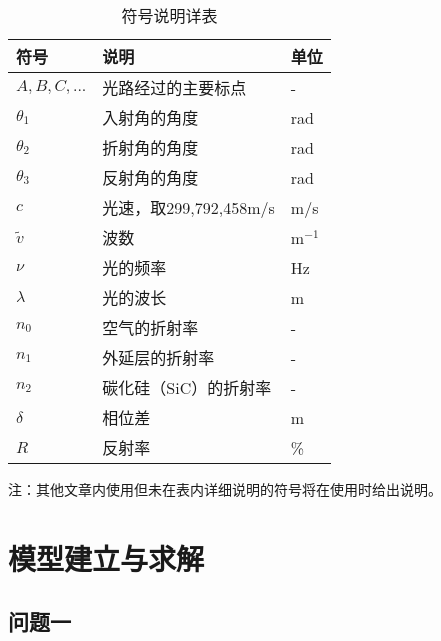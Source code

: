\documentclass[withoutpreface,bwprint]{cumcmthesis} %
\begin{document}
\begin{table}[H]
    \centering  %
    \caption{符号说明详表}  %
    \label{tab:符号说明}  %
    \begin{threeparttable}
        \begin{tabularx}{\textwidth}{p{} p{} l}
            \toprule[1.5pt]
            \textbf{符号} & \textbf{说明} & \textbf{单位} \\ 
            \midrule[1pt]
            $A, B, C, ...$ & 光路经过的主要标点 & - \\
            $\theta_1$ & 入射角的角度 & rad \\
            $\theta_2$ & 折射角的角度 & rad \\
            $\theta_3$ & 反射角的角度 & rad \\
            $c$ & 光速，取299,792,458m/s & m/s \\
            $\tilde{v} $ & 波数 & m$^{-1}$\\
            $\nu$ & 光的频率 & Hz\\
            $\lambda$ & 光的波长 & m\\
            $n_0$ & 空气的折射率 & - \\
            $n_1$ & 外延层的折射率 & - \\
            $n_2$ & 碳化硅（SiC）的折射率 & - \\
            $\delta$ & 相位差 & m \\
            $R$ & 反射率 & \% \\  

            \bottomrule[1.5pt]
        
        \end{tabularx}
        \begin{tablenotes}
            \footnotesize
            \item 注：其他文章内使用但未在表内详细说明的符号将在使用时给出说明。
        \end{tablenotes}
    \end{threeparttable}
\end{table}




\section{模型建立与求解}
\subsection{问题一}
\end{document}
